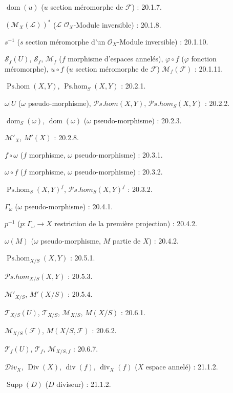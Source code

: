 $\operatorname{dom}(u)$ ($u$ section méromorphe de $\mathcal F$) : 20.1.7.

$(\mathcal M_X(\mathcal L))^{*}$
($\mathcal L$ $\mathcal O_X$-Module inversible) : 20.1.8.

$s^{-1}$ ($s$ section méromorphe d'un $\mathcal O_X$-Module inversible) : 20.1.10.

$\mathcal S_f(U)$, $\mathcal S_f$, $\mathcal M_f$
($f$ morphisme d'espaces annelés), $\varphi\circ f$ ($\varphi$ fonction méromorphe),
$u\circ f$ ($u$ section méromorphe de $\mathcal F$) $\mathcal M_f(\mathcal F)$ : 20.1.11.

$\operatorname{Ps.hom}(X,Y)$, $\operatorname{Ps.hom}_S(X,Y)$ : 20.2.1.

$\omega|U$ ($\omega$ pseudo-morphisme),
$\mathcal P\!s.\mathit{hom}(X,Y)$,
$\mathcal P\!s.\mathit{hom}_S(X,Y)$ : 20.2.2.

$\operatorname{dom}_S(\omega)$, $\operatorname{dom}(\omega)$
($\omega$ pseudo-morphisme) : 20.2.3.

$\mathcal M'_X$, $M'(X)$ : 20.2.8.

$f\circ\omega$ ($f$ morphisme, $\omega$ pseudo-morphisme) : 20.3.1.

$\omega\circ f$ ($f$ morphisme, $\omega$ pseudo-morphisme) : 20.3.2.

$\operatorname{Ps.hom}_S(X,Y)^f$,
$\mathcal P\!s.\mathit{hom}_S(X,Y)^f$ : 20.3.2.

$\Gamma_\omega$ ($\omega$ pseudo-morphisme) : 20.4.1.

$p^{-1}$ ($p:\Gamma_\omega\to X$ restriction de la première projection) : 20.4.2.

$\omega(M)$ ($\omega$ pseudo-morphisme, $M$ partie de $X$) : 20.4.2.

$\operatorname{Ps.hom}_{X/S}(X,Y)$ : 20.5.1.

$\mathcal P\!s.\mathit{hom}_{X/S}(X,Y)$ : 20.5.3.

$\mathcal M'_{X/S}$, $M'(X/S)$ : 20.5.4.

$\mathcal T_{X/S}(U)$, $\mathcal T_{X/S}$, $\mathcal M_{X/S}$,
$M(X/S)$ : 20.6.1.

$\mathcal M_{X/S}(\mathcal F)$, $M(X/S,\mathcal F)$ : 20.6.2.

$\mathcal T_f(U)$, $\mathcal T_f$, $\mathcal M_{X/S,f}$ : 20.6.7.

$\mathcal{D}iv_X$, $\operatorname{Div}(X)$, $\operatorname{div}(f)$,
$\operatorname{div}_X(f)$ ($X$ espace annelé) : 21.1.2.

$\operatorname{Supp}(D)$ ($D$ diviseur) : 21.1.2.

